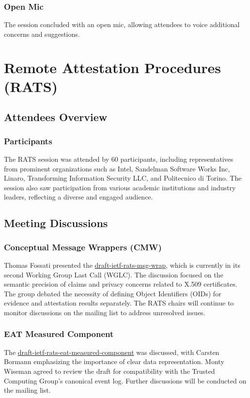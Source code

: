 \documentclass{article}
\begin{document}
\subsubsection{Open Mic}
The session concluded with an open mic, allowing attendees to voice additional concerns and suggestions.




\newpage

\section{Remote Attestation Procedures (RATS)}

\subsection{Attendees Overview}
\subsubsection{Participants}
The RATS session was attended by 60 participants, including representatives from prominent organizations such as Intel, Sandelman Software Works Inc, Linaro, Transforming Information Security LLC, and Politecnico di Torino. The session also saw participation from various academic institutions and industry leaders, reflecting a diverse and engaged audience.

\subsection{Meeting Discussions}

\subsubsection{Conceptual Message Wrappers (CMW)}
Thomas Fossati presented the \href{https://datatracker.ietf.org/doc/draft-ietf-rats-msg-wrap/}{draft-ietf-rats-msg-wrap}, which is currently in its second Working Group Last Call (WGLC). The discussion focused on the semantic precision of claims and privacy concerns related to X.509 certificates. The group debated the necessity of defining Object Identifiers (OIDs) for evidence and attestation results separately. The RATS chairs will continue to monitor discussions on the mailing list to address unresolved issues.

\subsubsection{EAT Measured Component}
The \href{https://datatracker.ietf.org/doc/draft-ietf-rats-eat-measured-component/}{draft-ietf-rats-eat-measured-component} was discussed, with Carsten Bormann emphasizing the importance of clear data representation. Monty Wiseman agreed to review the draft for compatibility with the Trusted Computing Group's canonical event log. Further discussions will be conducted on the mailing list.
\end{document}
